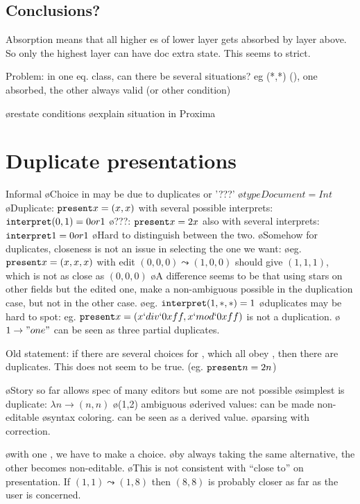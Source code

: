 \subsection{Conclusions?}

Absorption means that all higher es of lower layer gets absorbed by layer above. So only the highest layer can have doc extra state. This seems to strict.

Problem: in one eq. class, can there be several situations? eg (*,*) \dbarr (), one absorbed, the other always valid (or other condition)

\bl
\o restate conditions
\o explain situation in Proxima
\el





%																
%																
%																
\section{Duplicate presentations}

Informal
\bl
\o Choice in \interpret may be due to duplicates or '???'
\o $type Document = Int$ 
\o Duplicate: ${\tt present} x = (x,x)$ with several possible interprets: ${\tt interpret} (0,1) = 0 or 1$ 
\o ???: ${\tt present} x = 2x$ also with several interprets: ${\tt interpret} 1 = 0 or 1$ 
\o Hard to distinguish between the two.
\o Somehow for duplicates, closeness is not an issue in selecting the one we want:
\o eg. ${\tt present} x = (x,x,x)$ with edit $(0,0,0)\leadsto(1,0,0)$ should give $(1,1,1)$, which is not as close as $(0,0,0)$
\o A difference seems to be that using stars on other fields but the edited one, make a non-ambiguous \interpret possible in the duplication case, but not in the other case.
\o eg. ${\tt interpret} (1,*,*) = 1$
\o duplicates may be hard to spot: eg. ${\tt present} x = (x `div` 0xff, x `mod` 0xff)$ is not a duplication.
\o $1 \to "one"$ can be seen as three partial duplicates. 
\el

Old statement: if there are several choices for \interpret, which all obey , then there are duplicates. This does not seem to be true. (eg. ${\tt present} n = 2n$)


\bl
\o Story so far allows spec of many editors but some are not possible
\o simplest is duplicate: $\lambda n \to (n,n)$
\o (1,2) ambiguous
\o derived values: can be made non-editable
\o syntax coloring. can be seen as a derived value.
\o parsing with correction. 
\el

\bl
\o with one \interpret, we have to make a choice.
\o by always taking the same alternative, the other becomes non-editable.
\o This is not consistent with ``close to'' on presentation.  If $(1,1) \leadsto (1,8)$ then $(8,8)$ is probably closer as far as the user is concerned.
\el

